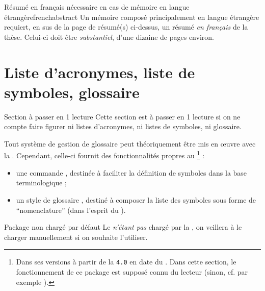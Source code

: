 \begin{dbwarning}{Résumé en français nécessaire en cas de mémoire en langue
    étrangère}{frenchabstract}
  Un mémoire composé principalement en langue étrangère  requiert, en sus de la page de
  résumé(s) ci-dessus, un résumé \emph{en français} de la thèse. Celui-ci doit
  être \emph{substantiel}, d'une dizaine de pages environ.
\end{dbwarning}

\section{Liste d'acronymes, liste de symboles,
  glossaire}\label{sec-sigl-gloss-nomencl}
%
%
%

\begin{dbremark*}{Section à passer en 1\iere{} lecture}
  Cette section est à passer en 1\iere{} lecture si on ne compte faire figurer
  ni listes d'acronymes, ni listes de symboles, ni glossaire.
\end{dbremark*}

Tout système de gestion de glossaire peut théoriquement être mis en œuvre avec
la \yatCl. Cependant, celle-ci fournit des fonctionnalités propres au
\footnote{Dans ses versions à partir de la \texttt{4.0} en
  date du . Dans cette section, le fonctionnement de ce
  package est supposé connu du lecteur (sinon, cf. par exemple
  \cite{en-ligne7}).} :
\begin{itemize}
\item une commande , destinée à faciliter la définition de
  symboles dans la base terminologique ;
\item un style de glossaire , destiné à composer la
  liste des symboles sous forme de \enquote{nomenclature} (dans l'esprit du
  ).
\end{itemize}

\begin{dbwarning}{Package  non chargé par défaut}{}
  Le  \emph{n'étant pas} chargé par la \yatCl, on veillera
  à le charger manuellement si on souhaite l'utiliser.
\end{dbwarning}

